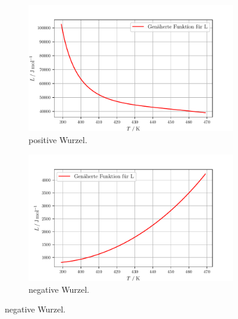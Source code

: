 \begin{figure}[htbp]
  \begin{subfigure}{\textwidth}
  \centering
  \includegraphics[scale=0.7]{build/plot3.pdf}
  \caption{positive Wurzel.}
  \label{fig:plot3}
\end{subfigure}
\begin{subfigure}{\textwidth}
  \centering
  \includegraphics[scale=0.7]{build/plot4.pdf}
  \caption{negative Wurzel.}
  \label{fig:plot4}
\end{subfigure}
\end{figure}


